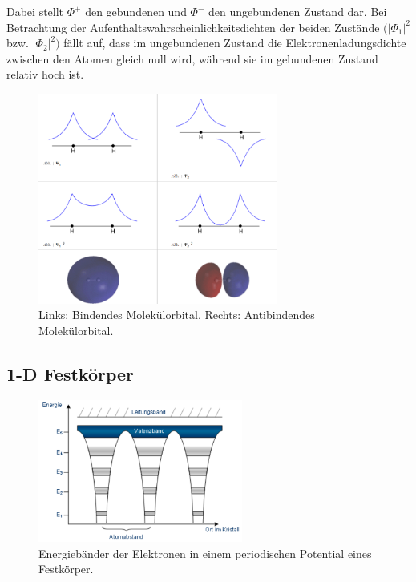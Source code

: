 Dabei stellt $\Phi^+$ den gebundenen und $\Phi^-$ den ungebundenen Zustand dar. Bei Betrachtung der Aufenthaltswahrscheinlichkeitsdichten
der beiden Zustände $(|\Phi_1|^2$ bzw. $|\Phi_2|^2)$ fällt auf, dass im ungebundenen Zustand die Elektronenladungsdichte zwischen den Atomen
gleich null wird, während sie im gebundenen Zustand relativ hoch ist.

\begin{figure}
\centering
\includegraphics[width=0.7\textwidth]{orbitale.png}
\caption{Links: Bindendes Molekülorbital. Rechts: Antibindendes Molekülorbital. \cite{chemga}}
\label{fig:orbitale}
\end{figure}

\subsection{1-D Festkörper}

\begin{figure}
\centering
\includegraphics[width=0.6\textwidth]{baender.png}
\caption{Energiebänder der Elektronen in einem periodischen Potential eines Festkörper. \cite{halbleiter}}
\label{fig:baender}
\end{figure}


